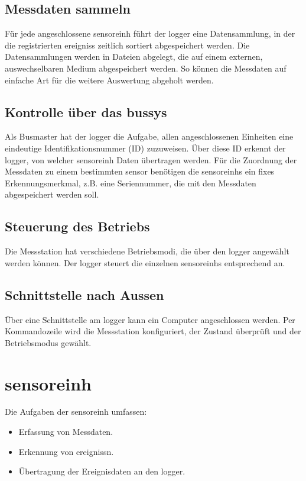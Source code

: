 \subsection{Messdaten sammeln}
Für jede angeschlossene \gls{sensoreinh} führt der \gls{logger} eine Datensammlung, in der die registrierten \glspl{ereignis} zeitlich sortiert abgespeichert werden. Die Datensammlungen werden in Dateien abgelegt, die auf einem externen, auswechselbaren Medium abgespeichert werden. So können die Messdaten auf einfache Art für die weitere Auswertung abgeholt werden.


\subsection{Kontrolle über das \gls{bussys}}
Als Busmaster hat der \gls{logger} die Aufgabe, allen angeschlossenen Einheiten eine eindeutige Identifikationsnummer (ID) zuzuweisen. Über diese ID erkennt der \gls{logger}, von welcher \gls{sensoreinh} Daten übertragen werden. Für die Zuordnung der Messdaten zu einem bestimmten \gls{sensor} benötigen die \glspl{sensoreinh} ein fixes Erkennungsmerkmal, z.B. eine Seriennummer, die mit den Messdaten abgespeichert werden soll.


\subsection{Steuerung des Betriebs}
Die Messstation hat verschiedene Betriebsmodi, die über den \gls{logger} angewählt werden können. Der \gls{logger} steuert die einzelnen \glspl{sensoreinh} entsprechend an.


\subsection{Schnittstelle nach Aussen}
Über eine Schnittstelle am \gls{logger} kann ein Computer angeschlossen werden. Per Kommandozeile wird die Messstation konfiguriert, der Zustand überprüft und der Betriebsmodus gewählt.


\section{\gls{sensoreinh}}
Die Aufgaben der \gls{sensoreinh} umfassen:
\begin{itemize}
\item Erfassung von Messdaten.
\item Erkennung von \glspl{ereignis}n.
\item Übertragung der Ereignisdaten an den \gls{logger}.
\end{itemize}

